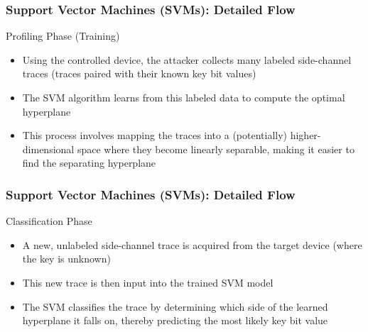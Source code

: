  
\begin{frame}
    \frametitle{Support Vector Machines (SVMs): Detailed Flow}
    \begin{block}{Profiling Phase (Training)}
        \begin{itemize}
            \item Using the controlled device, the attacker collects many labeled side-channel traces (traces paired with their known key bit values)
            \item The SVM algorithm learns from this labeled data to compute the optimal hyperplane
            \item This process involves mapping the traces into a (potentially) higher-dimensional space where they become linearly separable, making it easier to find the separating hyperplane
        \end{itemize}
    \end{block}
\end{frame}
\begin{frame}
\frametitle{Support Vector Machines (SVMs): Detailed Flow}
    \begin{block}{Classification Phase}
        \begin{itemize}
            \item A new, unlabeled side-channel trace is acquired from the target device (where the key is unknown)
            \item This new trace is then input into the trained SVM model
            \item The SVM classifies the trace by determining which side of the learned hyperplane it falls on, thereby predicting the most likely key bit value
        \end{itemize}
    \end{block}
\end{frame}
